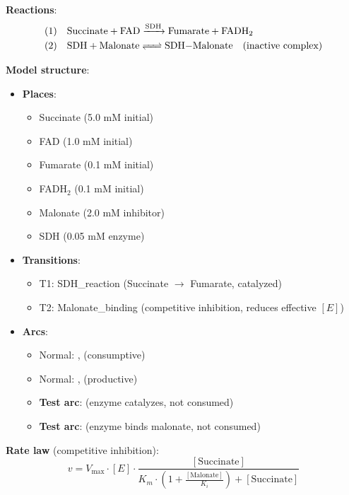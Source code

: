 \textbf{Reactions}:
\begin{align}
\text{(1)} \quad &\ce{Succinate + FAD ->[SDH] Fumarate + FADH2} \\
\text{(2)} \quad &\ce{SDH + Malonate <=> SDH-Malonate} \quad \text{(inactive complex)}
\end{align}

\textbf{Model structure}:

\begin{itemize}
    \item \textbf{Places}:
    \begin{itemize}
        \item Succinate (5.0 mM initial)
        \item FAD (1.0 mM initial)
        \item Fumarate (0.1 mM initial)
        \item FADH$_2$ (0.1 mM initial)
        \item Malonate (2.0 mM inhibitor)
        \item SDH (0.05 mM enzyme)
    \end{itemize}
    
    \item \textbf{Transitions}:
    \begin{itemize}
        \item T1: SDH\_reaction (Succinate $\to$ Fumarate, catalyzed)
        \item T2: Malonate\_binding (competitive inhibition, reduces effective $[E]$)
    \end{itemize}
    
    \item \textbf{Arcs}:
    \begin{itemize}
        \item Normal: ,  (consumptive)
        \item Normal: ,  (productive)
        \item \textbf{Test arc}:  (enzyme catalyzes, not consumed)
        \item \textbf{Test arc}:  (enzyme binds malonate, not consumed)
    \end{itemize}
\end{itemize}

\textbf{Rate law} (competitive inhibition):
\begin{equation}
v = V_{\max} \cdot [E] \cdot \frac{[\text{Succinate}]}{K_m \cdot \left(1 + \frac{[\text{Malonate}]}{K_i}\right) + [\text{Succinate}]}
\end{equation}

